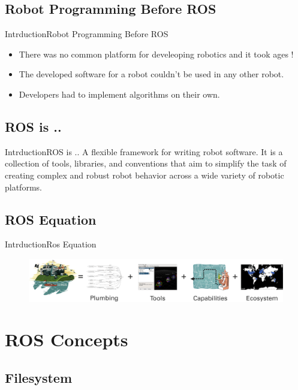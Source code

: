 \documentclass{beamer}
\begin{document}
\subsection{Robot Programming Before ROS}
\begin{frame}{Intrduction}{Robot Programming Before ROS}
\begin{itemize}
  \item
There was no common platform for develeoping robotics and it took ages !
  \item
The developed software for a robot couldn't be used in any other robot.
  \item
  Developers had to implement algorithms on their own.
  \end{itemize}
  
\end{frame}
\subsection{ROS is ..}
\begin{frame}{Intrduction}{ROS is ..}
A flexible framework for writing robot software. It is a collection of tools, libraries, and conventions that aim to simplify the task of creating complex and robust robot behavior across a wide variety of robotic platforms.
  
\end{frame}
\subsection{ROS Equation}
\begin{frame}{Intrduction}{Ros Equation}
\begin{figure}
\centering
\includegraphics[scale=1.4]{figs/ros_equation}
\end{figure}

  
\end{frame}

\section{ROS Concepts}

\subsection{Filesystem}
\end{document}
